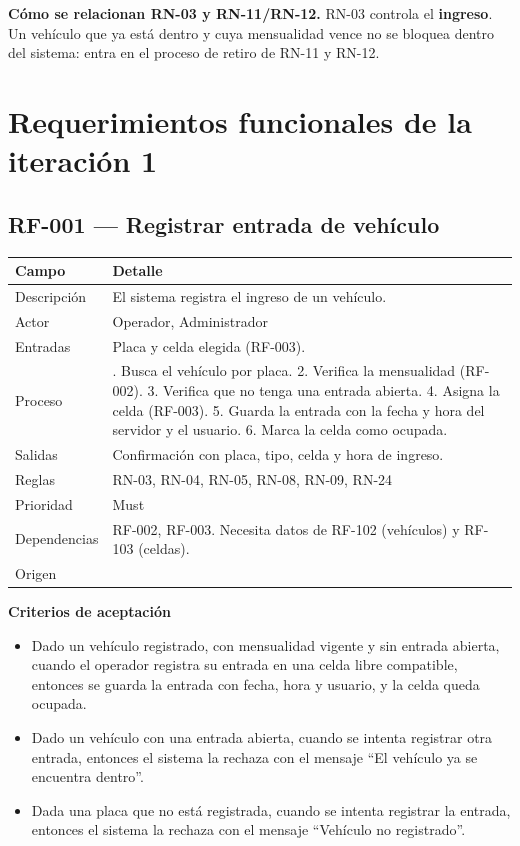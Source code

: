 \textbf{Cómo se relacionan RN-03 y RN-11/RN-12.} RN-03 controla el \textbf{ingreso}. Un vehículo que ya está dentro y cuya mensualidad vence no se bloquea dentro del sistema: entra en el proceso de retiro de RN-11 y RN-12.

\section{Requerimientos funcionales de la iteración 1}

\subsection{RF-001 — Registrar entrada de vehículo}
\begin{longtable}{>{\raggedright\arraybackslash}p{3.2cm}>{\raggedright\arraybackslash}p{11.2cm}}
\toprule
\textbf{Campo} & \textbf{Detalle}\\
\midrule\endhead
Descripción & El sistema registra el ingreso de un vehículo.\\
Actor & Operador, Administrador\\
Entradas & Placa y celda elegida (RF-003).\\
Proceso & 1. Busca el vehículo por placa. 2. Verifica la mensualidad (RF-002). 3. Verifica que no tenga una entrada abierta. 4. Asigna la celda (RF-003). 5. Guarda la entrada con la fecha y hora del servidor y el usuario. 6. Marca la celda como ocupada.\\
Salidas & Confirmación con placa, tipo, celda y hora de ingreso.\\
Reglas & RN-03, RN-04, RN-05, RN-08, RN-09, RN-24\\
Prioridad & Must\\
Dependencias & RF-002, RF-003. Necesita datos de RF-102 (vehículos) y RF-103 (celdas).\\
Origen & [E]\\
\bottomrule
\end{longtable}

\textbf{Criterios de aceptación}
\begin{itemize}
  \item Dado un vehículo registrado, con mensualidad vigente y sin entrada abierta, cuando el operador registra su entrada en una celda libre compatible, entonces se guarda la entrada con fecha, hora y usuario, y la celda queda ocupada.
  \item Dado un vehículo con una entrada abierta, cuando se intenta registrar otra entrada, entonces el sistema la rechaza con el mensaje ``El vehículo ya se encuentra dentro''.
  \item Dada una placa que no está registrada, cuando se intenta registrar la entrada, entonces el sistema la rechaza con el mensaje ``Vehículo no registrado''.
\end{itemize}


